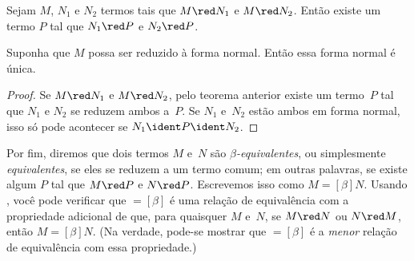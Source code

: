 \documentclass[../../../include/open-logic-section]{subfiles}
\begin{document}

\begin{thm}
Sejam $M$, $N_1$ e $N_2$ termos tais que $M \red N_1$ e $M \red N_2$.
Então existe um termo $P$ tal que $N_1 \red P$ e $N_2 \red P$.
\end{thm}

\begin{cor}
Suponha que $M$ possa ser reduzido à forma normal. Então essa forma normal é
única.
\end{cor}

\begin{proof}
Se $M \red N_1$ e $M \red N_2$, pelo teorema anterior existe um termo~$P$
tal que $N_1$ e $N_2$ se reduzem ambos a~$P$. Se $N_1$ e~$N_2$ estão ambos
em forma normal, isso só pode acontecer se $N_1 \ident P \ident N_2$.
\end{proof}

Por fim, diremos que dois termos $M$ e~$N$ são \emph{$\beta$-equivalentes},
ou simplesmente \emph{equivalentes}, se eles se reduzem a um termo comum;
em outras palavras, se existe algum $P$ tal que $M \red P$ e $N \red P$.
Escrevemos isso como $M \equal[\beta] N$. Usando
, você pode verificar que $\equal[\beta]$ é uma
relação de equivalência com a propriedade adicional de que, para quaisquer
$M$ e~$N$, se $M \red N$ ou $N \red M$, então $M \equal[\beta] N$. (Na
verdade, pode-se mostrar que $\equal[\beta]$ é a \emph{menor} relação de
equivalência com essa propriedade.)
\end{document}
